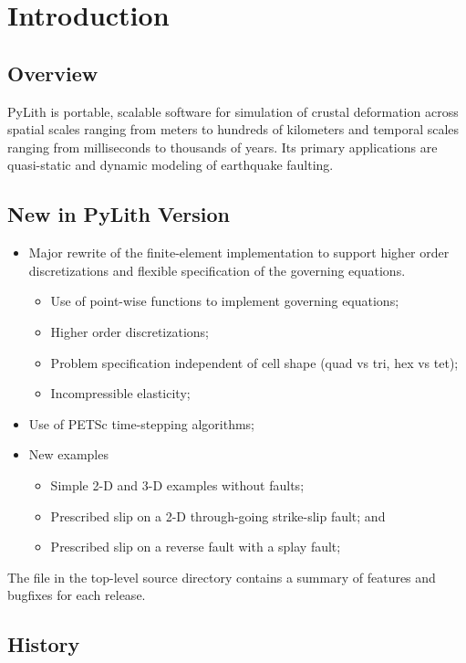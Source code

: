 \chapter{Introduction}


\section{Overview}

PyLith is portable, scalable software for simulation of crustal
deformation across spatial scales ranging from meters to hundreds of
kilometers and temporal scales ranging from milliseconds to thousands
of years. Its primary applications are quasi-static and dynamic
modeling of earthquake faulting.

\section{New in PyLith Version \pylithVersionNumber}
\begin{itemize}
\item Major rewrite of the finite-element implementation to support
  higher order discretizations and flexible specification of the
  governing equations.
  \begin{itemize}
  \item Use of point-wise functions to implement governing equations;
  \item Higher order discretizations;
  \item Problem specification independent of cell shape (quad vs tri,
    hex vs tet);
  \item Incompressible elasticity;
  \end{itemize}
\item Use of PETSc time-stepping algorithms;
\item New examples
  \begin{itemize}
  \item Simple 2-D and 3-D examples without faults;
  \item Prescribed slip on a 2-D through-going strike-slip fault; and
  \item Prescribed slip on a reverse fault with a splay fault;
  \end{itemize}
\end{itemize}
The  file in the top-level source directory contains
a summary of features and bugfixes for each release.


\section{History}

